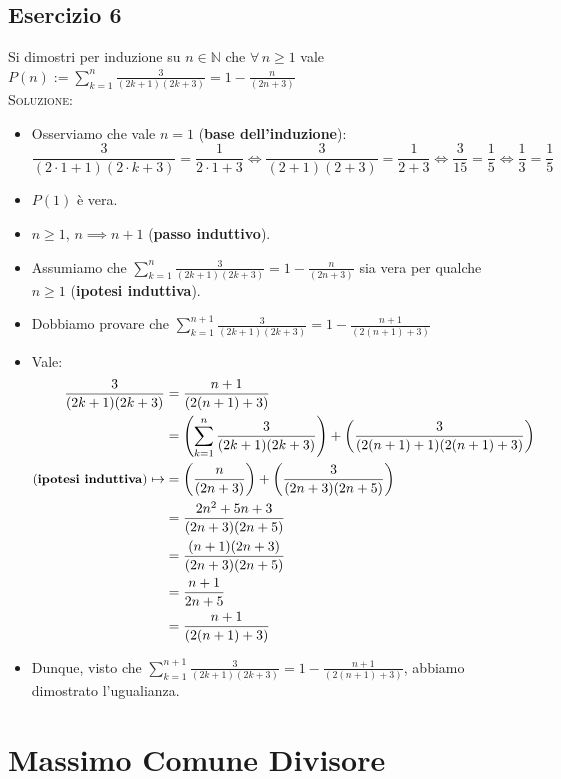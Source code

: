 \documentclass[10pt]{article}
\begin{document}
	\subsection{Esercizio 6}
	Si dimostri per induzione su $n \!\in\! \mathbb{N}$ che $\forall \, n \geq 1$ vale $P(n) := \displaystyle{\sum_{k=1}^n \frac{3}{(2k+1)(2k+3)} = 1 - \frac{n}{(2n + 3)}}$
	\\ \textsc{Soluzione:}
	\begin{itemize}	
	\item
	Osserviamo che vale $n=1$ (\textbf{base dell'induzione}):
	$$\frac{3}{(2\cdot 1 + 1)(2 \cdot k + 3)} = \frac{1}{2\cdot 1 + 3} \Longleftrightarrow \frac{3}{(2+1)(2+3)} = \frac{1}{2+3} \Longleftrightarrow \frac{3}{15} = \frac{1}{5} \Longleftrightarrow \frac{1}{3} = \frac{1}{5}$$
	\item
	$P(1)$ è vera.
	\item
	$n \geq 1$, $n \implies n+1$ (\textbf{passo induttivo}).
	\item
	Assumiamo che $\displaystyle{\sum_{k=1}^n \frac{3}{(2k+1)(2k+3)} = 1 - \frac{n}{(2n + 3)}}$ sia vera per qualche $n \geq 1$ (\textbf{ipotesi induttiva}).
	\item
	Dobbiamo provare che $\displaystyle{\sum_{k=1}^{n+1} \frac{3}{(2k+1)(2k+3)} = 1 - \frac{n+1}{(2(n+1) + 3)}}$
	\item
	Vale:
	\begin{equation}
	\begin{split}
	\frac{3}{(2k+1)(2k+3)} &= \frac{n+1}{(2(n+1) + 3)} \\
	&= \left(\sum_{k=1}^n \frac{3}{(2k+1)(2k+3)}\right) + \left(\frac{3}{(2(n+1)+1)(2(n+1)+3)}\right) \\
	\textrm{\small{(\textbf{ipotesi induttiva})}} \mapsto &= \left( \frac{n}{(2n+3)} \right) + \left( \frac{3}{(2n+3)(2n+5)} \right) \\
	&= \frac{2n^2 + 5n + 3}{(2n+3)(2n+5)} \\
	&= \frac{(n+1)(2n + 3)}{(2n+3)(2n+5)} \\
	&= \frac{n+1}{2n+5} \\
	&= \frac{n+1}{(2(n+1)+3)}
	\notag
	\end{split}
	\end{equation}
	\item
	Dunque, visto che $\displaystyle{\sum_{k=1}^{n+1} \frac{3}{(2k+1)(2k+3)} = 1 - \frac{n+1}{(2(n+1) + 3)}}$, abbiamo dimostrato l'ugualianza.
	\end{itemize}
	\newpage
	
  \section{Massimo Comune Divisore}
\end{document}
